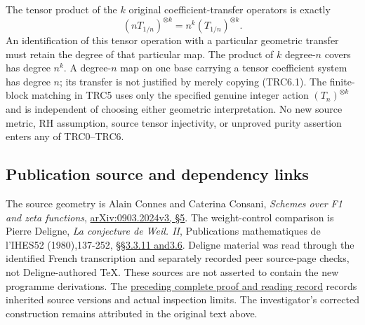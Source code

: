 The tensor product of the \(k\) original coefficient-transfer operators
is exactly \[
(nT_{1/n})^{\otimes k}=n^k(T_{1/n})^{\otimes k}.
\tag{TRC6.1}
\] An identification of this tensor operation with a particular
geometric transfer must retain the degree of that particular map. The
product of \(k\) degree-\(n\) covers has degree \(n^k\). A degree-\(n\)
map on one base carrying a tensor coefficient system has degree \(n\);
its transfer is not justified by merely copying (TRC6.1). The
finite-block matching in TRC5 uses only the specified genuine integer
action \((T_n)^{\otimes k}\) and is independent of choosing either
geometric interpretation. No new source metric, RH assumption, source
tensor injectivity, or unproved purity assertion enters any of
TRC0--TRC6.

\subsection{Publication source and dependency
links}\label{publication-source-and-dependency-links}

The source geometry is Alain Connes and Caterina Consani, \emph{Schemes
over F1 and zeta functions},
\href{https://arxiv.org/abs/0903.2024v3}{arXiv:0903.2024v3, §5}. The
weight-control comparison is Pierre Deligne, \emph{La conjecture de
Weil. II}, Publications mathematiques de l'IHES52 (1980),137-252,
\href{https://www.numdam.org/item/PMIHES_1980__52__137_0/}{§§3.3.11
and3.6}. Deligne material was read through the identified French
transcription and separately recorded peer source-page checks, not
Deligne-authored TeX. These sources are not asserted to contain the new
programme derivations. The
\href{https://github.com/KokunoYumeto/zeta-function-research-reader/blob/36a82ecca98addb8a98b48204e349737856c7223/workbenches/splitzero-tandem/continuations/20260924-cohomology-weight-and-character-lifts/BUILD_AND_REVIEW.md}{preceding
complete proof and reading record} records inherited source versions and
actual inspection limits. The investigator's corrected construction
remains attributed in the original text above.
